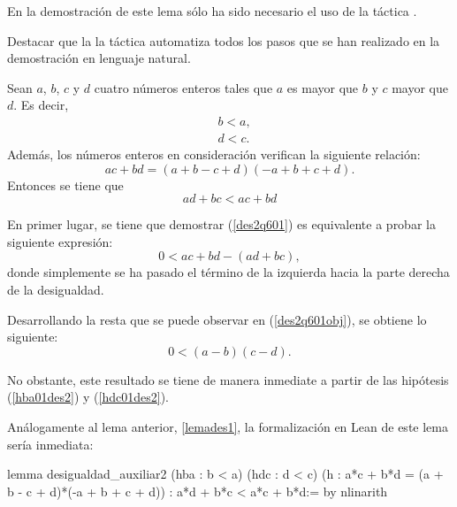 En la demostración de este lema sólo ha sido necesario el uso de la
táctica .

Destacar que la la táctica  automatiza
todos los pasos que se han realizado en la demostración en lenguaje
natural.

\begin{lema}\label{lemades2}
  Sean \(a\), \(b\), \(c\) y \(d\) cuatro números enteros tales que
  \(a\) es mayor que \(b\) y \(c\) mayor que \(d\). Es decir,
  \begin{align}
    &b<a,\tag{hba}\label{hba01des2}\\
    &d<c.\tag{hdc}\label{hdc01des2}
  \end{align}
  Además, los números enteros en consideración verifican la siguiente
  relación:
    \begin{equation}\tag{h}
      ac+bd = (a+b-c+d)(-a+b+c+d).
    \end{equation}
    Entonces se tiene que
    \begin{equation}\label{des2q601}
      ad+bc < ac+bd
    \end{equation}
\end{lema}

\begin{demostracion}
  En primer lugar, se tiene que demostrar (\ref{des2q601}) es
  equivalente a probar la siguiente expresión:
  \begin{equation}\label{des2q601obj}
      0<ac+bd-(ad+bc),
  \end{equation}
  donde simplemente se ha pasado el término de la izquierda hacia la
  parte derecha de la desigualdad.

  Desarrollando la resta que se puede observar en (\ref{des2q601obj}),
  se obtiene lo siguiente:
  \begin{equation}
    0<(a-b)(c-d).
  \end{equation}

  No obstante, este resultado se tiene de manera inmediate a partir de
  las hipótesis (\ref{hba01des2}) y (\ref{hdc01des2}).
\end{demostracion}

Análogamente al lema anterior, \ref{lemades1}, la formalización en Lean
de este lema sería inmediata:
\begin{leancode}
lemma desigualdad_auxiliar2
  (hba : b < a)
  (hdc : d < c)
  (h : a*c + b*d = (a + b - c + d)*(-a + b + c + d))
  : a*d + b*c < a*c + b*d:=
by nlinarith
\end{leancode}

